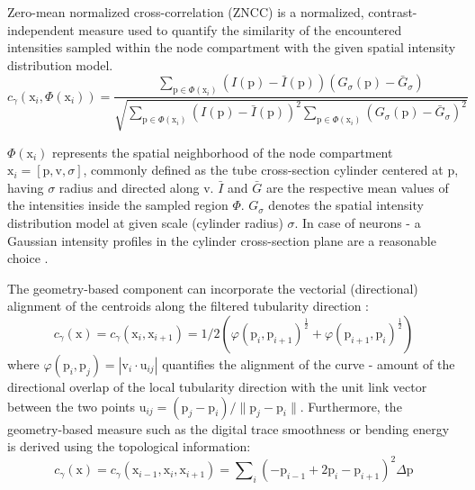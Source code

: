 Zero-mean normalized cross-correlation (ZNCC) is a normalized, contrast-independent measure used to quantify the similarity of the encountered intensities sampled within the node compartment with the given spatial intensity distribution model.
\begin{equation}
c_{\gamma}(\mathrm{x}_i, \Phi(\mathrm{x}_i)) = \frac{ \sum\limits_{\mathrm{p} \in \Phi(\mathrm{x}_i)} (I(\mathrm{p}) - \bar{I}(\mathrm{p}))(G_{\sigma}(\mathrm{p}) - \bar{G}_{\sigma}) }{ \sqrt{ \sum\limits_{\mathrm{p} \in \Phi(\mathrm{x}_i)}(I(\mathrm{p}) - \bar{I}(\mathrm{p}))^2 \sum\limits_{\mathrm{p} \in \Phi(\mathrm{x}_i)}(G_{\sigma}(\mathrm{p}) - \bar{G}_{\sigma})^2 } }
\label{ch1_eq1}
\end{equation}

$\Phi(\mathrm{x}_i)$ represents the spatial neighborhood of the node compartment $\mathrm{x}_i = [ \mathrm{p}, \mathrm{v}, \sigma ]$, commonly defined as the tube cross-section cylinder centered at $\mathrm{p}$, having $\sigma$ radius and directed along $\mathrm{v}$. $\bar{I}$ and $\bar{G}$ are the respective mean values of the intensities inside the sampled region $\Phi$. $G_{\sigma}$ denotes the spatial intensity distribution model at given scale (cylinder radius) $\sigma$. In case of neurons - a Gaussian intensity profiles in the cylinder cross-section plane are a reasonable choice \cite{radojevic2017neuron}. 

The geometry-based component can incorporate the vectorial (directional) alignment of the centroids along the filtered tubularity direction \cite{meijering2004design}:  
\begin{equation}
c_{\gamma}(\mathrm{x}) = c_{\gamma}(\mathrm{x}_{i}, \mathrm{x}_{i+1}) = 1/2 \left( \varphi(\mathrm{p}_i, \mathrm{p}_{i+1})^{\frac{1}{2}} + \varphi(\mathrm{p}_{i+1}, \mathrm{p}_{i})^{\frac{1}{2}} \right) 
\end{equation}
where $\varphi( \mathrm{p}_{i}, \mathrm{p}_{j} ) = | \mathrm{v}_i \cdot \mathrm{u}_{ij} |  $ quantifies the alignment of the curve - amount of the directional overlap of the local tubularity direction with the unit link vector between the two points $\mathrm{u}_{ij} = (\mathrm{p}_j - \mathrm{p}_i) / \lVert \mathrm{p}_j - \mathrm{p}_i \rVert $. Furthermore, the geometry-based measure such as the digital trace smoothness \cite{peng2010automatic} or bending energy \cite{radojevic2015fuzzy} is derived using the topological information:
\begin{equation}
c_{\gamma}(\mathrm{x}) = c_{\gamma}(\mathrm{x}_{i-1}, \mathrm{x}_{i}, \mathrm{x}_{i+1}) = \sum\nolimits_{i} (- \mathrm{p}_{i-1} + 2\mathrm{p}_i - \mathrm{p}_{i+1})^2 \Delta\mathrm{p}
\end{equation}

